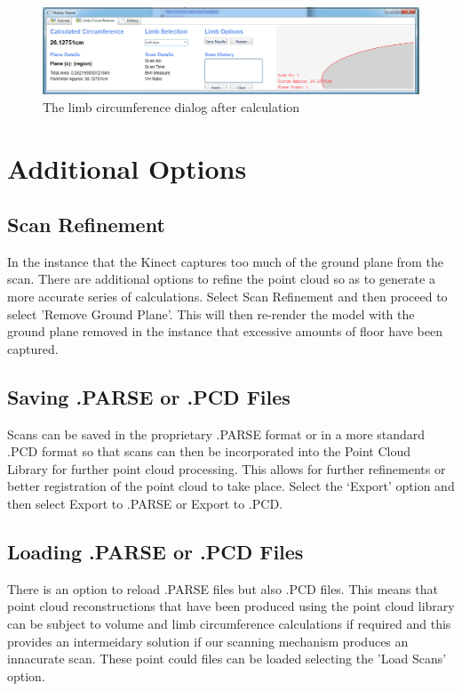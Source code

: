 \begin{Description}
\begin{figure}[!h]
\begin{center}
\includegraphics[scale=0.35]{zscreenshots/circumdetail.png}
\end{center}
\caption{The limb circumference dialog after calculation}
\label{limb circumference detail}
\end{figure}


\section{Additional Options}

\subsection{Scan Refinement}

In the instance that the Kinect captures too much of the ground plane from the scan. There are additional options to refine the point cloud so as to generate a more accurate series of calculations. Select Scan Refinement and then proceed to select 'Remove Ground Plane'. This will then re-render the model with the ground plane removed in the instance that excessive amounts of floor have been captured.

\subsection{Saving .PARSE or .PCD Files}

Scans can be saved in the proprietary .PARSE format or in a more standard .PCD format so that scans can then be incorporated into the Point Cloud Library for further point cloud processing. This allows for further refinements or better registration of the point cloud to take place. Select the `Export' option and then select Export to .PARSE or Export to .PCD.

\subsection{Loading .PARSE or .PCD Files}

There is an option to reload .PARSE files but also .PCD files. This means that point cloud reconstructions that have been produced using the point cloud library can be subject to volume and limb circumference calculations if required and this provides an intermeidary solution if our scanning mechanism produces an innacurate scan. These point could files can be loaded selecting the 'Load Scans' option.


\end{Description}
